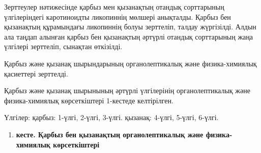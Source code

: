 Зерттеулер нәтижесінде қарбыз мен қызанақтың отандық сорттарының
үлгілеріндегі каротиноидты ликопиннің мөлшері анықталды. Қарбыз бен
қызанақтың құрамындағы ликопиннің болуы зерттеліп, талдау жүргізілді.
Алдын ала таңдап алынған қарбыз бен қызанақтың әртүрлі отандық
сорттарының жаңа үлгілері зерттеліп, сынақтан өткізілді.

Қарбыз және қызанақ шырындарының органолептикалық және физика-химиялық
қасиеттері зерттелді.

Қарбыз және қызанақ шырынының әртүрлі үлгілерінің органолептикалық және
физика-химиялық көрсеткіштері 1-кестеде келтірілген.

Үлгілер: қарбыз: 1-үлгі, 2-үлгі, 3-үлгі. қызанақ: 4-үлгі, 5-үлгі,
6-үлгі.

\begin{enumerate}
\def\labelenumi{\arabic{enumi}.}
\item
  {\bfseries кесте. Қарбыз бен қызанақтың органолептикалық және
  физика-химиялық көрсеткіштері}
\end{enumerate}

% 
% 

